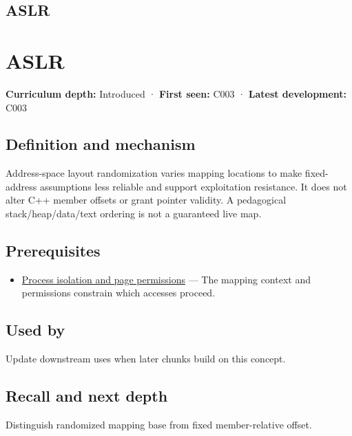 \hypertarget{appendix-78cb248c8355}{}
\section*{ASLR}
\chapter{ASLR}\label{appendix-78cb248c8355-aslr}

\textbf{Curriculum depth:} Introduced · \textbf{First seen:} C003 · \textbf{Latest development:} C003

\section{Definition and mechanism}\label{appendix-78cb248c8355-definition-and-mechanism}

Address-space layout randomization varies mapping locations to make fixed-address assumptions less reliable and support exploitation resistance. It does not alter C++ member offsets or grant pointer validity. A pedagogical stack/heap/data/text ordering is not a guaranteed live map.

\section{Prerequisites}\label{appendix-78cb248c8355-prerequisites}

\begin{itemize}
\tightlist
\item
  \hyperref[appendix-c2a9ad1e2b49]{Process isolation and page permissions} --- The mapping context and permissions constrain which accesses proceed.
\end{itemize}

\section{Used by}\label{appendix-78cb248c8355-used-by}

Update downstream uses when later chunks build on this concept.

\section{Recall and next depth}\label{appendix-78cb248c8355-recall-and-next-depth}

Distinguish randomized mapping base from fixed member-relative offset.

